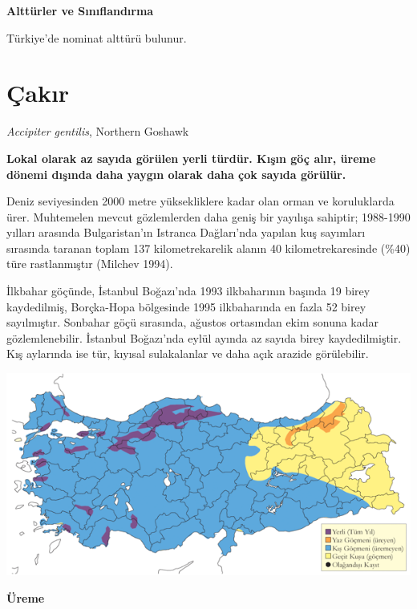\documentclass[
  letterpaper,
  DIV=11,
  numbers=noendperiod]{scrreprt}
\begin{document}
\textbf{Alttürler ve Sınıflandırma}

Türkiye'de nominat alttürü bulunur.

\section{Çakır}\label{uxe7akux131r}

\emph{Accipiter gentilis}, Northern Goshawk

\textbf{Lokal olarak az sayıda görülen yerli türdür. Kışın göç alır,
üreme dönemi dışında daha yaygın olarak daha çok sayıda görülür.}

Deniz seviyesinden 2000 metre yüksekliklere kadar olan orman ve
koruluklarda ürer. Muhtemelen mevcut gözlemlerden daha geniş bir
yayılışa sahiptir; 1988-1990 yılları arasında Bulgaristan'ın Istranca
Dağları'nda yapılan kuş sayımları sırasında taranan toplam 137
kilometrekarelik alanın 40 kilometrekaresinde (\%40) türe rastlanmıştır
(Milchev 1994).

İlkbahar göçünde, İstanbul Boğazı'nda 1993 ilkbaharının başında 19 birey
kaydedilmiş, Borçka-Hopa bölgesinde 1995 ilkbaharında en fazla 52 birey
sayılmıştır. Sonbahar göçü sırasında, ağustos ortasından ekim sonuna
kadar gözlemlenebilir. İstanbul Boğazı'nda eylül ayında az sayıda birey
kaydedilmiştir. Kış aylarında ise tür, kıyısal sulakalanlar ve daha açık
arazide görülebilir.

\includegraphics{images/harita_Page_101.png}

\textbf{Üreme}
\end{document}
